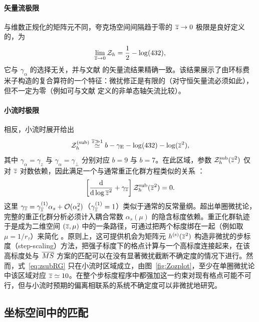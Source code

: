 \paragraph{矢量流极限}与维数正规化的矩阵元不同，夸克场空间间隔趋于零的 $\overline{z}\to 0$ 极限是良好定义的，为
\begin{equation}\label{eq:veclimit}
\lim_{\overline{z}\to0}{\cal Z}_h  = \frac{1}{2}-\log(432),
\end{equation}
它与 $\gamma_\alpha$ 的选择无关，并与文献 \cite{Hieda:2016lly} 的矢量流结果精确一致。该结果展示了由环标费米子构造的复合算符的一个特征：微扰修正是有限的（对守恒矢量流必须如此），但不一定为零（例如可与文献 \cite{Endo:2015iea} 定义的非单态轴矢流比较）。


\paragraph{小流时极限}相反，小流时展开给出
\begin{equation}\label{eq:zsmalltau}
{\cal Z}_h^{\mathrm{(sub)}} \stackrel{\overline{z}\gg1}{\simeq} b - \gamma_{\mathrm{E}} - \log(432) - \log(\overline{z}^2),
\end{equation}
其中 $\gamma_\alpha = \gamma_z$ 与 $\gamma_\alpha = \gamma_\perp$ 分别对应 $b = 9$ 与 $b=7$。在此区域，参数 ${\cal Z}_h^{\mathrm{sub}}(\overline{z}^2)$ 仅对 $\overline{z}$ 对数依赖，因此满足一个与通常重正化群方程类似的关系 \cite{Monahan:2015lha}：
\begin{equation}\label{eq:zsubRG}
\left[\frac{\mathrm{d}}{\mathrm{d}\log\overline{z}^2} +\gamma_{\overline{z}}\right]{\cal Z}_h^{\mathrm{sub}}(\overline{z}^2) = 0.
\end{equation}
这里 $\gamma_{\overline{z}} = \gamma_{\overline{z}}^{(1)}\alpha_s+{\cal O}(\alpha_s^2)$（$\gamma_{\overline{z}}^{(1)}=1$）类似于通常的反常量纲。超出单圈微扰论，完整的重正化群分析必须计入耦合常数 $\alpha_s(\mu)$ 的隐含标度依赖。重正化群轨迹于是成为二维空间 $(\overline{z},\mu)$ 中的一条路径，可通过把两个标度绑在一起（例如取 $\mu = 1/r_\tau$）来简化 \cite{Monahan:2015lha}。原则上，这可提供机会为矩阵元 $h^{(\mathrm{s})}(\overline{z}^2)$ 构造非微扰的步标度（step-scaling）方法，把强子标度下的格点计算与一个高标度连接起来，在该高标度处与 $\overline{MS}$ 方案的匹配可以在没有显著微扰截断不确定度的情况下进行。然而，式~\eqref{eq:zsubRG} 只在小流时区域成立，由图~\ref{fig:Zozplot}，至少在单圈微扰论中该区域对应 $\overline{z} \simeq 10$。在整个步标度程序中都强加这一约束对现有格点可能不可行，但与小流时预期的偏离相联系的系统不确定度可以非微扰地研究。


\subsection{坐标空间中的匹配}

